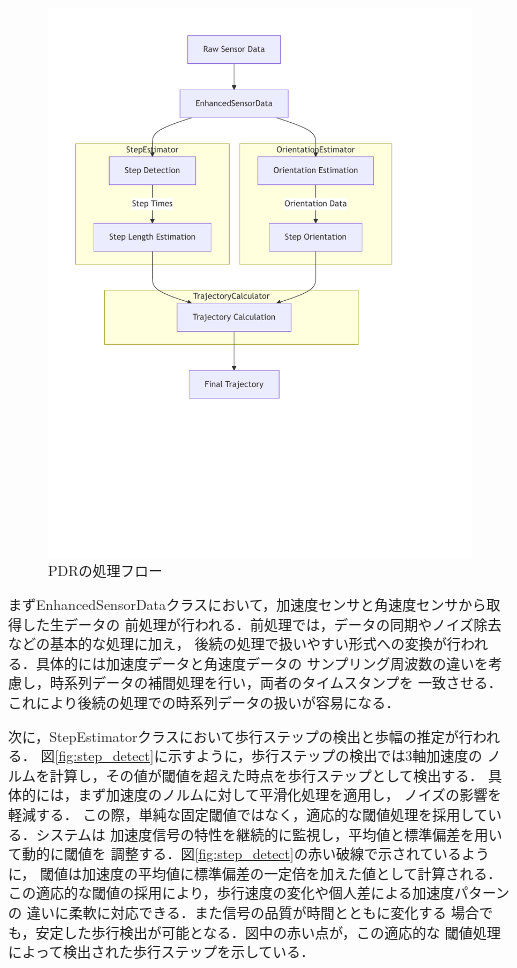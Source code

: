 \begin{figure}[H]
    \centering
    \includegraphics[width=\linewidth]{image/pdr-flow-diagram.pdf}
    \caption{PDRの処理フロー}
    \label{fig:pdr-flow}
\end{figure}

まずEnhancedSensorDataクラスにおいて，加速度センサと角速度センサから取得した生データの
前処理が行われる．前処理では，データの同期やノイズ除去などの基本的な処理に加え，
後続の処理で扱いやすい形式への変換が行われる．具体的には加速度データと角速度データの
サンプリング周波数の違いを考慮し，時系列データの補間処理を行い，両者のタイムスタンプを
一致させる．これにより後続の処理での時系列データの扱いが容易になる．


次に，StepEstimatorクラスにおいて歩行ステップの検出と歩幅の推定が行われる．
図\ref{fig:step_detect}に示すように，歩行ステップの検出では3軸加速度の
ノルムを計算し，その値が閾値を超えた時点を歩行ステップとして検出する．
具体的には，まず加速度のノルムに対して平滑化処理を適用し，
ノイズの影響を軽減する．
この際，単純な固定閾値ではなく，適応的な閾値処理を採用している．システムは
加速度信号の特性を継続的に監視し，平均値と標準偏差を用いて動的に閾値を
調整する．図\ref{fig:step_detect}の赤い破線で示されているように，
閾値は加速度の平均値に標準偏差の一定倍を加えた値として計算される．
この適応的な閾値の採用により，歩行速度の変化や個人差による加速度パターンの
違いに柔軟に対応できる．また信号の品質が時間とともに変化する
場合でも，安定した歩行検出が可能となる．図中の赤い点が，この適応的な
閾値処理によって検出された歩行ステップを示している．

